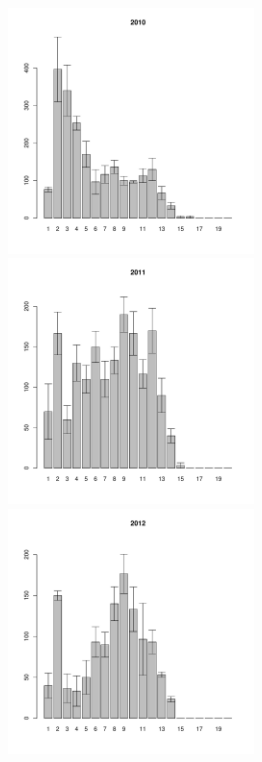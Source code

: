 \documentclass[12pt, a4paper]{article}
\begin{document}
\begin{figure}[h]

\begin{multicols}{3}
\hfill
\includegraphics[width=65mm]{../White_Sea/Estuatiy_Luvenga/sizestr_2010_.pdf}
\hfill
\end{multicols}

\begin{multicols}{3}
\hfill
\includegraphics[width=65mm]{../White_Sea/Estuatiy_Luvenga/sizestr_2011_.pdf}
\end{multicols}



\begin{multicols}{3}
\hfill
\includegraphics[width=65mm]{../White_Sea/Estuatiy_Luvenga/sizestr_2012_.pdf}
\end{multicols}


\end{figure}
\end{document}
